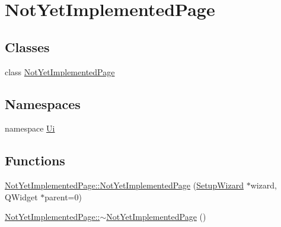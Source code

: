 \hypertarget{group___not_yet_implemented_page}{\section{\-Not\-Yet\-Implemented\-Page}
\label{group___not_yet_implemented_page}
}
\subsection*{\-Classes}
\begin{DoxyCompactItemize}
\item 
class \hyperlink{class_not_yet_implemented_page}{\-Not\-Yet\-Implemented\-Page}
\end{DoxyCompactItemize}
\subsection*{\-Namespaces}
\begin{DoxyCompactItemize}
\item 
namespace \hyperlink{namespace_ui}{\-Ui}
\end{DoxyCompactItemize}
\subsection*{\-Functions}
\begin{DoxyCompactItemize}
\item 
\hyperlink{group___not_yet_implemented_page_ga2d16a7a61f866fb399f6e888957a8fdc}{\-Not\-Yet\-Implemented\-Page\-::\-Not\-Yet\-Implemented\-Page} (\hyperlink{class_setup_wizard}{\-Setup\-Wizard} $\ast$wizard, \-Q\-Widget $\ast$parent=0)
\item 
\hyperlink{group___not_yet_implemented_page_gaddca330fa063b9b729adc5f9eb7f3eeb}{\-Not\-Yet\-Implemented\-Page\-::$\sim$\-Not\-Yet\-Implemented\-Page} ()
\end{DoxyCompactItemize}


